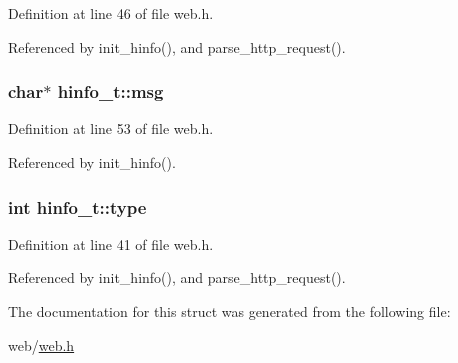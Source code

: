 Definition at line 46 of file web.\+h.



Referenced by init\+\_\+hinfo(), and parse\+\_\+http\+\_\+request().

\subsubsection[{\texorpdfstring{msg}{msg}}]{\setlength{\rightskip}{0pt plus 5cm}char$\ast$ hinfo\+\_\+t\+::msg}\hypertarget{structhinfo__t_a06469570091ad74724457998e07d5b56}{}\label{structhinfo__t_a06469570091ad74724457998e07d5b56}


Definition at line 53 of file web.\+h.



Referenced by init\+\_\+hinfo().

\subsubsection[{\texorpdfstring{type}{type}}]{\setlength{\rightskip}{0pt plus 5cm}int hinfo\+\_\+t\+::type}\hypertarget{structhinfo__t_a4e896141431943909a71282fc56799fb}{}\label{structhinfo__t_a4e896141431943909a71282fc56799fb}


Definition at line 41 of file web.\+h.



Referenced by init\+\_\+hinfo(), and parse\+\_\+http\+\_\+request().



The documentation for this struct was generated from the following file\+:\begin{DoxyCompactItemize}
\item 
web/\hyperlink{web_8h}{web.\+h}\end{DoxyCompactItemize}
